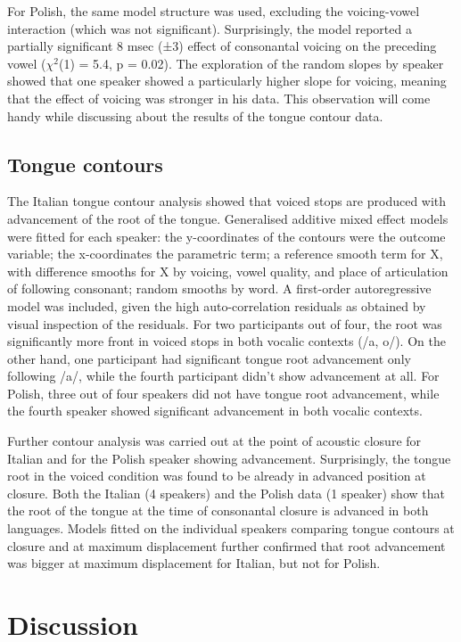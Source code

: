 \documentclass[authoryear, twocolumn]{elsarticle}
\begin{document}
For Polish, the same model structure was used, excluding the
voicing-vowel interaction (which was not significant). Surprisingly, the
model reported a partially significant 8 msec (±3) effect of consonantal
voicing on the preceding vowel (\(\chi^2\)(1) = 5.4, p = 0.02). The
exploration of the random slopes by speaker showed that one speaker
showed a particularly higher slope for voicing, meaning that the effect
of voicing was stronger in his data. This observation will come handy
while discussing about the results of the tongue contour data.

\subsection{Tongue contours}\label{tongue-contours}

The Italian tongue contour analysis showed that voiced stops are
produced with advancement of the root of the tongue. Generalised
additive mixed effect models were fitted for each speaker: the
y-coordinates of the contours were the outcome variable; the
x-coordinates the parametric term; a reference smooth term for X, with
difference smooths for X by voicing, vowel quality, and place of
articulation of following consonant; random smooths by word. A
first-order autoregressive model was included, given the high
auto-correlation residuals as obtained by visual inspection of the
residuals. For two participants out of four, the root was significantly
more front in voiced stops in both vocalic contexts (/a, o/). On the
other hand, one participant had significant tongue root advancement only
following /a/, while the fourth participant didn't show advancement at
all. For Polish, three out of four speakers did not have tongue root
advancement, while the fourth speaker showed significant advancement in
both vocalic contexts.

Further contour analysis was carried out at the point of acoustic
closure for Italian and for the Polish speaker showing advancement.
Surprisingly, the tongue root in the voiced condition was found to be
already in advanced position at closure. Both the Italian (4 speakers)
and the Polish data (1 speaker) show that the root of the tongue at the
time of consonantal closure is advanced in both languages. Models fitted
on the individual speakers comparing tongue contours at closure and at
maximum displacement further confirmed that root advancement was bigger
at maximum displacement for Italian, but not for Polish.

\section{Discussion}\label{discussion}
\end{document}
